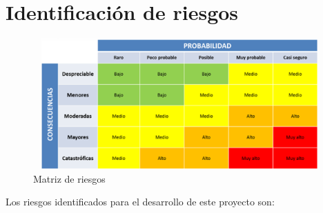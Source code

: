 \documentclass[a4paper,11pt]{report}
\begin{document}
\section*{Identificación de riesgos}



\begin{figure}[h]
    \centering
    \includegraphics[height=5cm, width=12cm]{matriz_riesgos.png}
    \caption{Matriz de riesgos}
\end{figure}

Los riesgos identificados para el desarrollo de este proyecto son:
\end{document}
